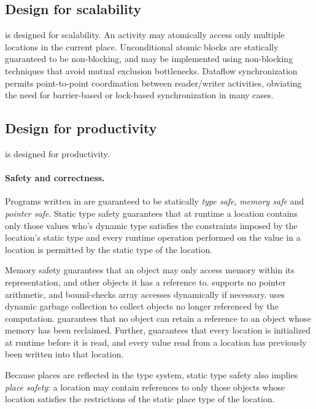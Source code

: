 \subsection{Design for scalability}
\Xten{} is designed for scalability. An activity may atomically
access only multiple locations in the current place. Unconditional
atomic blocks are statically guaranteed to be non-blocking, and may
be implemented using non-blocking techniques that avoid mutual
exclusion bottlenecks. Dataflow synchronization permits point-to-point
coordination between reader/writer activities, obviating the need for
barrier-based or lock-based synchronization in many cases.

\subsection{Design for productivity}
\Xten{} is designed for productivity. 

\paragraph{Safety and correctness.} 
Programs written in \Xten{} are guaranteed to be statically
\emph{type
safe}, \emph{memory safe} and \emph{pointer safe}. Static type safety
guarantees that at runtime a location contains only those values who's
dynamic type satisfies the constraints imposed by the location's
static type and every runtime operation performed on the value in a
location is permitted by the static type of the location.

Memory safety guarantees that an object may only access memory within
its representation, and other objects it has a reference to. \Xten{}
supports no pointer arithmetic, and bound-checks array accesses
dynamically if necessary. \Xten{} uses dynamic garbage collection to
collect objects no longer referenced by the computation. \Xten{}
guarantees that no object can retain a reference to an object
whose memory has been reclaimed.  Further, \Xten{} guarantees that
every location is initialized at runtime before it is read, 
and every value read from a location has previously been written into
that location. 


Because places are reflected in the type system, static type safety
also implies \emph{place safety}: a location may contain references to only
those objects whose location satisfies the restrictions of the static
place type of the location.

